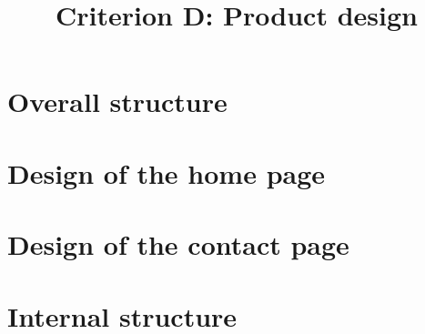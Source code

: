 \documentclass[a4paper]{article}
\title{Criterion D: Product design}
\date{}
\begin{document}
\maketitle

  \section*{Overall structure}

  \section*{Design of the home page}

  \section*{Design of the contact page}

  \section*{Internal structure}
\end{document}

